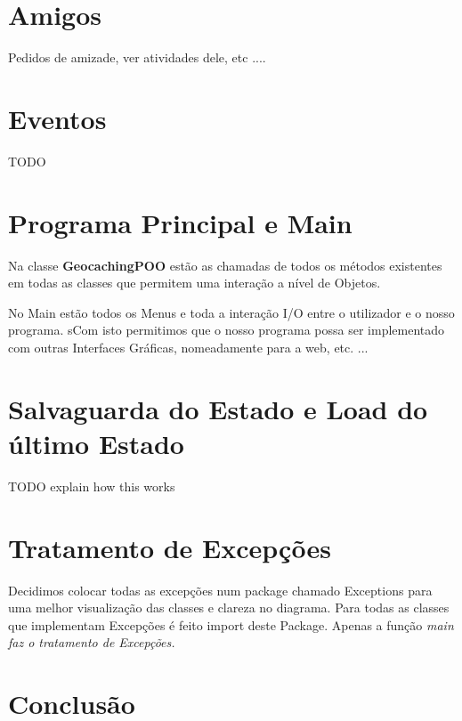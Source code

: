 \documentclass{article}
\begin{document}
\section{Amigos}
Pedidos de amizade, ver atividades dele, etc ....




\pagebreak
\section{Eventos}
TODO










\pagebreak
\section{Programa Principal e Main}
\quad Na classe \textbf{GeocachingPOO} estão as chamadas de todos os métodos existentes em todas as classes que 
permitem uma interação a nível de Objetos.

\par No Main estão todos os Menus e toda a interação I/O entre o utilizador e o nosso programa. sCom isto permitimos que o nosso programa possa ser implementado com outras Interfaces Gráficas, nomeadamente para a 
web, etc. ...




\pagebreak
\section{Salvaguarda do Estado e Load do último Estado}
TODO explain how this works




\pagebreak
\section{Tratamento de Excepções}
\quad Decidimos colocar todas as excepções num package chamado Exceptions para uma melhor visualização das classes e 
clareza no diagrama. Para todas as classes que implementam Excepções é feito import deste Package. Apenas a função 
\em main faz o tratamento de Excepções.
\pagebreak
\section{Conclusão}
\end{document}

